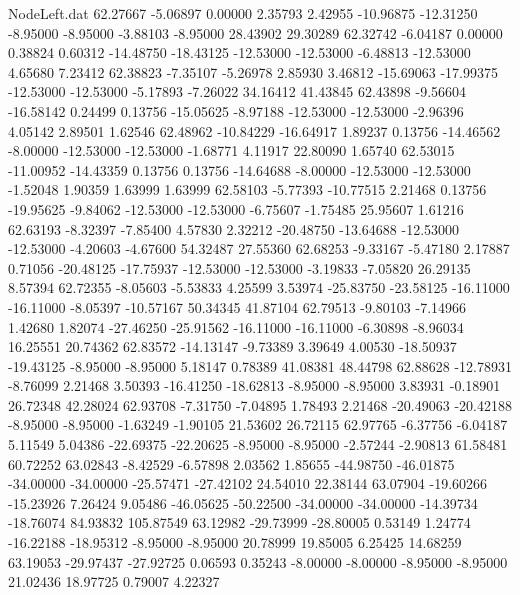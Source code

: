 \begin{filecontents}{NodeLeft.dat}
  62.27667   -5.06897    0.00000     2.35793    2.42955  -10.96875  -12.31250   -8.95000   -8.95000   -3.88103   -8.95000   28.43902   29.30289
  62.32742   -6.04187    0.00000     0.38824    0.60312  -14.48750  -18.43125  -12.53000  -12.53000   -6.48813  -12.53000    4.65680    7.23412
  62.38823   -7.35107   -5.26978     2.85930    3.46812  -15.69063  -17.99375  -12.53000  -12.53000   -5.17893   -7.26022   34.16412   41.43845
  62.43898   -9.56604  -16.58142     0.24499    0.13756  -15.05625   -8.97188  -12.53000  -12.53000   -2.96396    4.05142    2.89501    1.62546
  62.48962  -10.84229  -16.64917     1.89237    0.13756  -14.46562   -8.00000  -12.53000  -12.53000   -1.68771    4.11917   22.80090    1.65740
  62.53015  -11.00952  -14.43359     0.13756    0.13756  -14.64688   -8.00000  -12.53000  -12.53000   -1.52048    1.90359    1.63999    1.63999
  62.58103   -5.77393  -10.77515     2.21468    0.13756  -19.95625   -9.84062  -12.53000  -12.53000   -6.75607   -1.75485   25.95607    1.61216
  62.63193   -8.32397   -7.85400     4.57830    2.32212  -20.48750  -13.64688  -12.53000  -12.53000   -4.20603   -4.67600   54.32487   27.55360
  62.68253   -9.33167   -5.47180     2.17887    0.71056  -20.48125  -17.75937  -12.53000  -12.53000   -3.19833   -7.05820   26.29135    8.57394
  62.72355   -8.05603   -5.53833     4.25599    3.53974  -25.83750  -23.58125  -16.11000  -16.11000   -8.05397  -10.57167   50.34345   41.87104
  62.79513   -9.80103   -7.14966     1.42680    1.82074  -27.46250  -25.91562  -16.11000  -16.11000   -6.30898   -8.96034   16.25551   20.74362
  62.83572  -14.13147   -9.73389     3.39649    4.00530  -18.50937  -19.43125   -8.95000   -8.95000    5.18147    0.78389   41.08381   48.44798
  62.88628  -12.78931   -8.76099     2.21468    3.50393  -16.41250  -18.62813   -8.95000   -8.95000    3.83931   -0.18901   26.72348   42.28024
  62.93708   -7.31750   -7.04895     1.78493    2.21468  -20.49063  -20.42188   -8.95000   -8.95000   -1.63249   -1.90105   21.53602   26.72115
  62.97765   -6.37756   -6.04187     5.11549    5.04386  -22.69375  -22.20625   -8.95000   -8.95000   -2.57244   -2.90813   61.58481   60.72252
  63.02843   -8.42529   -6.57898     2.03562    1.85655  -44.98750  -46.01875  -34.00000  -34.00000  -25.57471  -27.42102   24.54010   22.38144
  63.07904  -19.60266  -15.23926     7.26424    9.05486  -46.05625  -50.22500  -34.00000  -34.00000  -14.39734  -18.76074   84.93832  105.87549
  63.12982  -29.73999  -28.80005     0.53149    1.24774  -16.22188  -18.95312   -8.95000   -8.95000   20.78999   19.85005    6.25425   14.68259
  63.19053  -29.97437  -27.92725     0.06593    0.35243   -8.00000   -8.00000   -8.95000   -8.95000   21.02436   18.97725    0.79007    4.22327

\end{filecontents}
